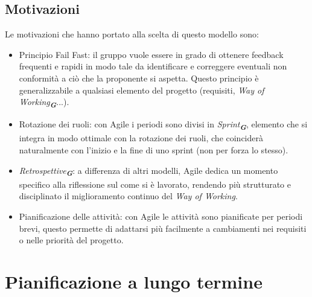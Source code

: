 \documentclass[a4paper,12pt]{article}
\newcommand{\glossario}[1]{\textit{#1}\textsubscript{\textbf{\textit{\textcolor{lightblack}{G}}}}}
\begin{document}
\subsection{Motivazioni}
Le motivazioni che hanno portato alla scelta di questo modello sono:
\begin{itemize}
    \item Principio Fail Fast: il gruppo vuole essere in grado di ottenere feedback frequenti e rapidi in modo tale da identificare e correggere eventuali non conformità a ciò che la proponente si aspetta. Questo principio è generalizzabile a qualsiasi elemento del progetto (requisiti, \glossario{Way of Working}...).
    \item Rotazione dei ruoli: con Agile i periodi sono divisi in \glossario{Sprint}, elemento che si integra in modo ottimale con la rotazione dei ruoli, che coinciderà naturalmente con l'inizio e la fine di uno sprint (non per forza lo stesso).
    \item \glossario{Retrospettive}: a differenza di altri modelli, Agile dedica un momento specifico alla riflessione sul come si è lavorato, rendendo più strutturato e disciplinato il miglioramento continuo del \textit{Way of Working}.
    \item Pianificazione delle attività: con Agile le attività sono pianificate per periodi brevi, questo permette di adattarsi più facilmente a cambiamenti nei requisiti o nelle priorità del progetto.
\end{itemize}



\section{Pianificazione a lungo termine}
\end{document}
